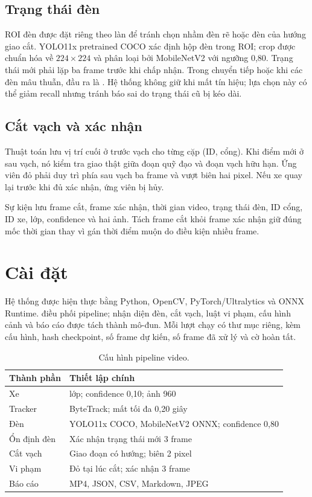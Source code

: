 \documentclass[11pt,a4paper]{article}
\newcommand{\code}[1]{{\small\texttt{\detokenize{#1}}}}
\begin{document}
\subsection{Trạng thái đèn}
ROI đèn được đặt riêng theo làn để tránh chọn nhầm đèn rẽ hoặc đèn của hướng giao cắt. YOLO11x pretrained COCO xác định hộp đèn trong ROI; crop được chuẩn hóa về $224\times224$ và phân loại bởi MobileNetV2 với ngưỡng 0,80. Trạng thái mới phải lặp ba frame trước khi chấp nhận. Trong chuyển tiếp hoặc khi các đèn mâu thuẫn, đầu ra là \code{UNKNOWN}. Hệ thống không giữ \code{RED} khi mất tín hiệu; lựa chọn này có thể giảm recall nhưng tránh báo sai do trạng thái cũ bị kéo dài.

\subsection{Cắt vạch và xác nhận}
Thuật toán lưu vị trí cuối ở trước vạch cho từng cặp (ID, cổng). Khi điểm mới ở sau vạch, nó kiểm tra giao thật giữa đoạn quỹ đạo và đoạn vạch hữu hạn. Ứng viên đỏ phải duy trì phía sau vạch ba frame và vượt biên hai pixel. Nếu xe quay lại trước khi đủ xác nhận, ứng viên bị hủy.

Sự kiện lưu frame cắt, frame xác nhận, thời gian video, trạng thái đèn, ID cổng, ID xe, lớp, confidence và hai ảnh. Tách frame cắt khỏi frame xác nhận giữ đúng mốc thời gian thay vì gán thời điểm muộn do điều kiện nhiều frame.

\section{Cài đặt}
Hệ thống được hiện thực bằng Python, OpenCV, PyTorch/Ultralytics và ONNX Runtime. \code{main.py} điều phối pipeline; nhận diện đèn, cắt vạch, luật vi phạm, cấu hình cảnh và báo cáo được tách thành mô-đun. Mỗi lượt chạy có thư mục riêng, kèm cấu hình, hash checkpoint, số frame dự kiến, số frame đã xử lý và cờ hoàn tất.

\begin{table}[t]
\centering\small
\begin{tabularx}{\columnwidth}{@{}l>{\raggedright\arraybackslash}X@{}}
\toprule Thành phần & Thiết lập chính \\
\midrule
Xe & 5 lớp; confidence 0,10; ảnh 960 \\
Tracker & ByteTrack; mất tối đa 0,20 giây \\
Đèn & YOLO11x COCO, MobileNetV2 ONNX; confidence 0,80 \\
Ổn định đèn & Xác nhận trạng thái mới 3 frame \\
Cắt vạch & Giao đoạn có hướng; biên 2 pixel \\
Vi phạm & Đỏ tại lúc cắt; xác nhận 3 frame \\
Báo cáo & MP4, JSON, CSV, Markdown, JPEG \\
\bottomrule
\end{tabularx}
\caption{Cấu hình pipeline video.}
\label{tab:runtime}
\end{table}
\end{document}
